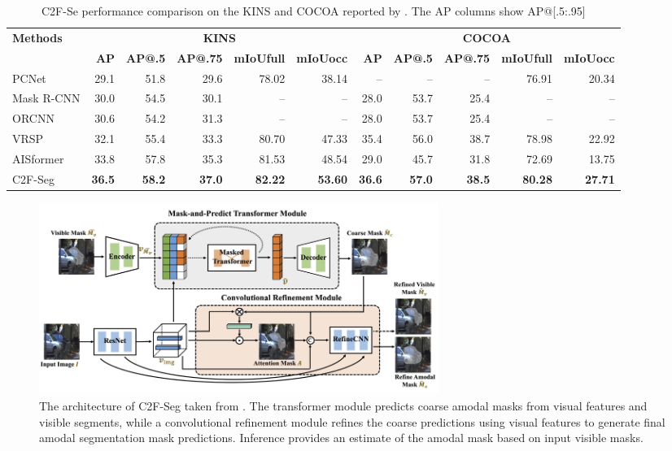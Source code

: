\begin{table}[htbp]
	\centering
	{\scriptsize 
		\begin{tabular}{lrrrrr|rrrrr}
			\toprule
			\multirow{2}{*}{\textbf{Methods}} & \multicolumn{5}{c|}{\textbf{KINS}} & \multicolumn{5}{c}{\textbf{COCOA}} \\
			\cmidrule(r){2-6} \cmidrule(l){7-11}
			& \textbf{AP} & \textbf{AP@.5} & \textbf{AP@.75} & \textbf{mIoUfull} & \textbf{mIoUocc} & \textbf{AP} & \textbf{AP@.5} & \textbf{AP@.75} & \textbf{mIoUfull} & \textbf{mIoUocc} \\
			\midrule
			PCNet & 29.1 & 51.8 & 29.6 & 78.02 & 38.14 & --  & -- & -- & 76.91 & 20.34 \\
			Mask R-CNN & 30.0 & 54.5 & 30.1 & -- & -- & 28.0 & 53.7 & 25.4 & -- & -- \\
			ORCNN & 30.6 & 54.2 & 31.3 & -- & -- & 28.0 & 53.7 & 25.4 & -- & -- \\
			VRSP & 32.1 & 55.4 & 33.3 & 80.70 & 47.33  & 35.4 & 56.0 & 38.7 & 78.98 & 22.92 \\
			AISformer & 33.8 & 57.8 & 35.3 & 81.53 & 48.54 & 29.0 & 45.7 & 31.8 & 72.69 & 13.75 \\
			C2F-Seg & \textbf{36.5} & \textbf{58.2} & \textbf{37.0} & \textbf{82.22} & \textbf{53.60} & \textbf{36.6}& \textbf{57.0} & \textbf{38.5} & \textbf{80.28} & \textbf{27.71} \\
			\bottomrule
		\end{tabular}
		\caption{C2F-Se performance comparison on the KINS and COCOA reported by \cite{c2fseg}. The AP columns show AP@[.5:.95]}
		\label{tab:c2f_report}
	}
\end{table}


\begin{figure}[htb]%
	\centering%
	\includegraphics[width=130mm]{figures/C2F-Seg_arch.jpg}%
	\caption{The architecture of C2F-Seg taken from \cite{c2fseg}. The transformer module predicts coarse amodal masks from visual features and visible segments, while a convolutional refinement module refines the coarse predictions using visual features to generate final amodal segmentation mask predictions. Inference provides an estimate of the amodal mask based on input visible masks.}%
	\label{Fig:C2F_seg architecture}%
\end{figure}%

